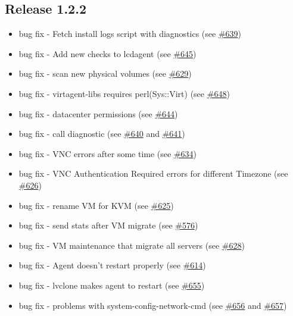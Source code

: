 \subsection{Release 1.2.2}

\begin{itemize}
    \item bug fix - Fetch install logs script with diagnostics (see \href{https://srcmaster.eurotux.com/pm/p/etva/ticket/639}{\#639})
    \item bug fix - Add new checks to lcdagent (see \href{https://srcmaster.eurotux.com/pm/p/etva/ticket/645}{\#645})
    \item bug fix - scan new physical volumes (see \href{https://srcmaster.eurotux.com/pm/p/etva/ticket/629}{\#629})
    \item bug fix - virtagent-libs requires perl(Sys::Virt) (see \href{https://srcmaster.eurotux.com/pm/p/etva/ticket/648}{\#648})
    \item bug fix - datacenter permissions (see \href{https://srcmaster.eurotux.com/pm/p/etva/ticket/644}{\#644})
    \item bug fix - call diagnostic (see \href{https://srcmaster.eurotux.com/pm/p/etva/ticket/640}{\#640} and \href{https://srcmaster.eurotux.com/pm/p/etva/ticket/641}{\#641})
    \item bug fix - VNC errors after some time (see \href{https://srcmaster.eurotux.com/pm/p/etva/ticket/634}{\#634})
    \item bug fix - VNC Authentication Required errors for different Timezone (see \href{https://srcmaster.eurotux.com/pm/p/etva/ticket/626}{\#626})
    \item bug fix - rename VM for KVM (see \href{https://srcmaster.eurotux.com/pm/p/etva/ticket/625}{\#625})
    \item bug fix - send stats after VM migrate (see \href{https://srcmaster.eurotux.com/pm/p/etva/ticket/576}{\#576})
    \item bug fix - VM maintenance that migrate all servers (see \href{https://srcmaster.eurotux.com/pm/p/etva/ticket/628}{\#628})
    \item bug fix - Agent doesn't restart properly (see \href{https://srcmaster.eurotux.com/pm/p/etva/ticket/614}{\#614})
    \item bug fix - lvclone makes agent to restart (see \href{https://srcmaster.eurotux.com/pm/p/etva/ticket/655}{\#655})
    \item bug fix - problems with system-config-network-cmd (see \href{https://srcmaster.eurotux.com/pm/p/etva/ticket/656}{\#656} and \href{https://srcmaster.eurotux.com/pm/p/etva/ticket/657}{\#657})

\end{itemize}
